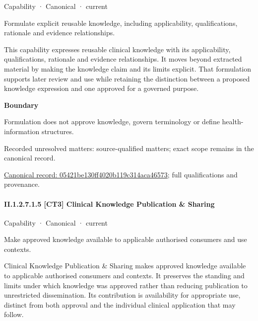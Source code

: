 \label{element:05421be130ff4020b119c314aca46573}
{\small Capability · Canonical · current}\par

Formulate explicit reusable knowledge, including applicability, qualifications, rationale and evidence relationships.



This capability expresses reusable clinical knowledge with its applicability, qualifications, rationale and evidence relationships. It moves beyond extracted material by making the knowledge claim and its limits explicit. That formulation supports later review and use while retaining the distinction between a proposed knowledge expression and one approved for a governed purpose.



\textbf{Boundary}



Formulation does not approve knowledge, govern terminology or define health-information structures.


{\small Recorded unresolved matters: source-qualified matters; exact scope remains in the canonical record.}\par
{\footnotesize \href{../../../../continuum/strategy/capability/05421be130ff4020b119c314aca46573.md}{Canonical record: 05421be130ff4020b119c314aca46573}; full qualifications and provenance.}\par
\paragraph*{II.1.2.7.1.5 [CT3] Clinical Knowledge Publication \& Sharing}
\label{navigation:II.1.2.7.1.5}

\label{element:962a5e3048424ff7b2413e21a8e51f53}
{\small Capability · Canonical · current}\par

Make approved knowledge available to applicable authorised consumers and use contexts.



Clinical Knowledge Publication \& Sharing makes approved knowledge available to applicable authorised consumers and contexts. It preserves the standing and limits under which knowledge was approved rather than reducing publication to unrestricted dissemination. Its contribution is availability for appropriate use, distinct from both approval and the individual clinical application that may follow.




